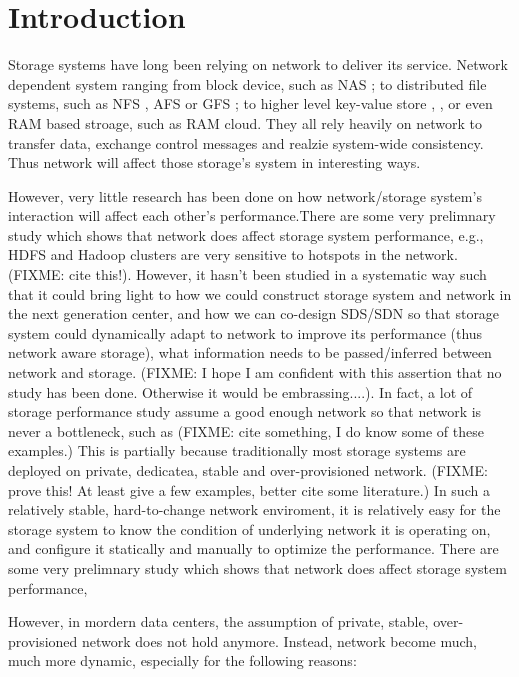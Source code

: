 \section{Introduction}
\label{section:intro}

Storage systems have long been relying on network to deliver its service. Network dependent system ranging from block device, such as NAS \cite{nas}; to distributed file systems, such as NFS \cite{nfs}, AFS \cite{afs} or GFS \cite{gfs}; to higher level key-value store \cite{dynamo}, \cite{big-table}, or even RAM based stroage, such as RAM cloud. They all rely heavily on network to transfer data, exchange control messages and realzie system-wide consistency. Thus network will affect those storage's system in interesting ways.

However, very little research has been done on how network/storage system's interaction will affect each other's performance.There are some very prelimnary study which shows that network does affect storage system performance, e.g., HDFS and Hadoop clusters are very sensitive to hotspots in the network.(FIXME: cite this!). However, it hasn't been studied in a systematic way such that it could bring light to how we could construct storage system and network in the next generation center, and how we can co-design SDS/SDN so that storage system could dynamically adapt to network to improve its performance (thus network aware storage), what information needs to be passed/inferred between network and storage. (FIXME: I hope I am confident with this assertion that no study has been done. Otherwise it would be embrassing....). In fact, a lot of storage performance study assume a good enough network so that network is never a bottleneck, such as (FIXME: cite something, I do know some of these examples.)
This is partially because traditionally most storage systems are deployed on private, dedicatea, stable and over-provisioned network. (FIXME: prove this! At least give a few examples, better cite some literature.) In such a relatively stable, hard-to-change network enviroment, it is relatively easy for the storage system to know the condition of underlying network it is operating on, and configure it statically and manually to optimize the performance. There are some very prelimnary study which shows that network does affect storage system performance, 

However, in mordern data centers, the assumption of private, stable, over-provisioned network does not hold anymore. Instead, network become much, much more dynamic, especially for the following reasons:

